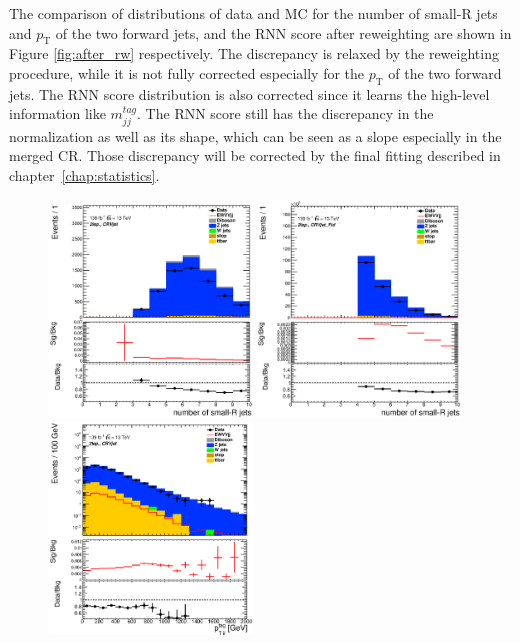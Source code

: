 The comparison of distributions of data and MC for the number of small-R jets and $p_\mathrm{T}$ of the two forward jets, and the RNN score after reweighting are shown in Figure \ref{fig:after_rw}
respectively. The discrepancy is relaxed by the reweighting procedure, while it is not fully corrected especially for the $p_\mathrm{T}$ of the two forward jets.
The RNN score distribution is also corrected since it learns the high-level information like $m^{tag}_{jj}$.
The RNN score still has the discrepancy in the normalization as well as its shape, which can be seen as a slope especially in the merged CR.
Those discrepancy will be corrected by the final fitting described in chapter~\ref{chap:statistics}.
\begin{figure}[ht]
    \centering
    \includegraphics[width=0.48\textwidth]{figures/2lep/reweighting/after_reweighting/C_0ptag1pfat0pjet_0ptv_CRVjet_NJets_Lin.eps}
    \includegraphics[width=0.48\textwidth]{figures/2lep/reweighting/after_reweighting/C_0ptag2pjet_0ptv_CRVjet_Fid_NJets_Lin.eps}
    \includegraphics[width=0.48\textwidth]{figures/2lep/reweighting/after_reweighting/C_0ptag1pfat0pjet_0ptv_CRVjet_PtTagMerJets_Log.eps}

\end{figure}
